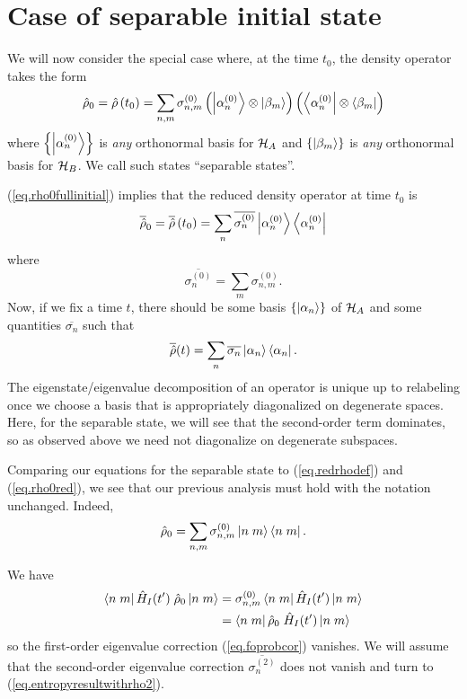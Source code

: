 \section{Case of separable initial state}\label{sec.separablestate}

We will now consider the special case where, at the time \(t_0\), the density operator takes the form
\begin{equation}\label{eq.rho0fullinitial}
\hat{\rho}_0 = \hat{\rho}\left(t_0\right) = \sum_{n,m} \sigma_{n,m}^{(0)} \left(\left|\alpha_n^{(0)}\right\rangle\otimes\left|\beta_m\right\rangle\right) \left(\left\langle\alpha_n^{(0)}\right|\otimes\left\langle\beta_m\right|\right)
\end{equation}
where \(\left\{\left|\alpha_n^{(0)}\right\rangle\right\}\) is \emph{any} orthonormal basis for \(\mathcal{H}_A\) and \(\left\{\left|\beta_m\right\rangle\right\}\) is \emph{any} orthonormal basis for \(\mathcal{H}_B\). We call such states ``separable states''.

(\ref{eq.rho0fullinitial}) implies that the reduced density operator at time \(t_0\) is
\[
\overline{\hat{\rho}}_0 = \overline{\hat{\rho}}\left(t_0\right) = \sum_n \overline{\sigma_{n}^{(0)}} \left|\alpha_n^{(0)}\right\rangle\left\langle\alpha_n^{(0)}\right|
\]
where
\[
\overline{\sigma_n^{(0)}} = \sum_m \sigma_{n,m}^{(0)}.
\]
Now, if we fix a time \(t\), there should be some basis \(\{\left|\alpha_n\right\rangle\}\) of \(\mathcal{H}_A\) and some quantities \(\overline{\sigma_n}\) such that
\[
\overline{\hat{\rho}}(t) = \sum_n \overline{\sigma_n} \left|\alpha_n\right\rangle\left\langle\alpha_n\right|.
\]
The eigenstate/eigenvalue decomposition of an operator is unique up to relabeling once we choose a basis that is appropriately diagonalized on degenerate spaces. Here, for the separable state, we will see that the second-order term dominates, so as observed above we need not diagonalize on degenerate subspaces.

Comparing our equations for the separable state to (\ref{eq.redrhodef}) and (\ref{eq.rho0red}), we see that our previous analysis must hold with the notation unchanged. Indeed,
\begin{equation}
\label{eq.rho0full}
\hat{\rho}_0 = \sum_{n,m} \sigma_{n,m}^{(0)} \left|n\;m\right\rangle\left\langle n\;m\right|.
\end{equation}

We have
\begin{align*}
\left\langle n\;m\right| \hat{H}_I(t^\prime) \;\hat{\rho}_0 \left|n\;m\right\rangle 
&= 
\sigma_{n,m}^{(0)} \left\langle n\;m\right| \hat{H}_I(t^\prime) \left|n\;m\right\rangle 
\\&=
 \left\langle n\;m\right| \hat{\rho}_0 \;\hat{H}_I(t^\prime) \left|n\;m\right\rangle 
\end{align*}
so the first-order eigenvalue correction (\ref{eq.foprobcor}) vanishes. We will assume that the second-order eigenvalue correction \(\overline{\sigma_n^{(2)}}\) does not vanish and turn to (\ref{eq.entropyresultwithrho2}).

